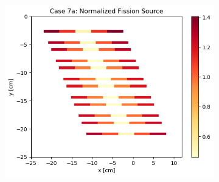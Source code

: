 \documentclass[letterpaper,11pt]{report}
\begin{document}
\begin{figure}[H]
\begin{subfigure}{.32\textwidth}
        \includegraphics[width=\linewidth]{../../phase1a/case7a/analysis_output/p1a_7a_c.png}
        \caption{}
      \end{subfigure}
    \caption{}
    \label{fig:test}
    \end{figure}

\pagebreak 
\end{document}
